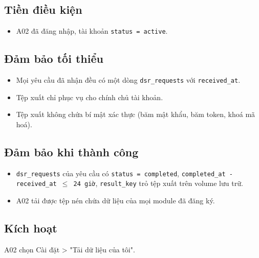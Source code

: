 \subsection{Tiền điều kiện}
\begin{itemize}
\item A02 đã đăng nhập, tài khoản {\small\texttt{status = active}}.
\end{itemize}
\subsection{Đảm bảo tối thiểu}
\begin{itemize}
\item Mọi yêu cầu đã nhận đều có một dòng {\small\texttt{dsr\_\allowbreak{}\allowbreak{}requests}} với {\small\texttt{received\_\allowbreak{}\allowbreak{}at}}.
\item Tệp xuất chỉ phục vụ cho chính chủ tài khoản.
\item Tệp xuất không chứa bí mật xác thực (băm mật khẩu, băm token, khoá mã hoá).
\end{itemize}
\subsection{Đảm bảo khi thành công}
\begin{itemize}
\item {\small\texttt{dsr\_\allowbreak{}\allowbreak{}requests}} của yêu cầu có {\small\texttt{status = completed}}, {\small\texttt{completed\_\allowbreak{}\allowbreak{}at - received\_\allowbreak{}\allowbreak{}at \ensuremath{\leq} 24 giờ}}, {\small\texttt{result\_\allowbreak{}\allowbreak{}key}} trỏ tệp xuất trên volume lưu trữ.
\item A02 tải được tệp nén chứa dữ liệu của mọi module đã đăng ký.
\end{itemize}
\subsection{Kích hoạt}
A02 chọn Cài đặt > "Tải dữ liệu của tôi".

